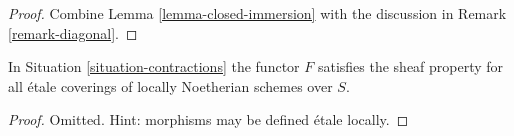 \begin{proof}
Combine Lemma \ref{lemma-closed-immersion}
with the discussion in Remark \ref{remark-diagonal}.
\end{proof}

\begin{lemma}
\label{lemma-sheaf}
In Situation \ref{situation-contractions} the functor
$F$ satisfies the sheaf property for all \'etale coverings
of locally Noetherian schemes over $S$.
\end{lemma}

\begin{proof}
Omitted. Hint: morphisms may be defined \'etale locally.
\end{proof}
















